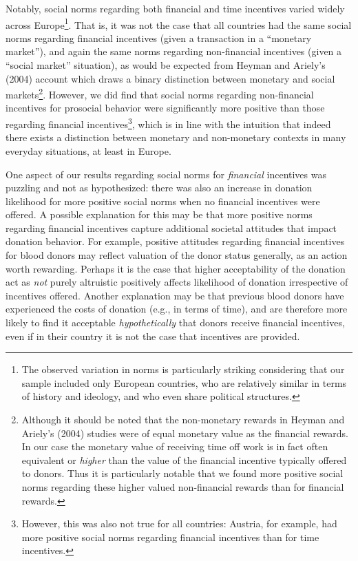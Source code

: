 \documentclass[AER]{AEA}
\begin{document}
Notably, social norms regarding both financial and time incentives varied widely across Europe\footnote{The observed variation in norms is particularly striking considering that our sample included only European countries, who are relatively similar in terms of history and ideology, and who even share political structures.}. That is, it was not the case that all countries had the same social norms regarding financial incentives (given a transaction in a “monetary market”), and again the same norms regarding non-financial incentives (given a “social market” situation), as would be expected from Heyman and Ariely’s (2004) account which draws a binary distinction between monetary and social markets\footnote{Although it should be noted that the non-monetary rewards in Heyman and Ariely’s (2004) studies were of equal monetary value as the financial rewards. In our case the monetary value of receiving time off work is in fact often equivalent or \textit{higher} than the value of the financial incentive typically offered to donors. Thus it is particularly notable that we found more positive social norms regarding these higher valued non-financial rewards than for financial rewards.}. However, we did find that social norms regarding non-financial incentives for prosocial behavior were significantly more positive than those regarding financial incentives\footnote{However, this was also not true for all countries: Austria, for example, had more positive social norms regarding financial incentives than for time incentives.}, which is in line with the intuition that indeed there exists a distinction between monetary and non-monetary contexts in many everyday situations, at least in Europe. 

One aspect of our results regarding social norms for \textit{financial} incentives was puzzling and not as hypothesized: there was also an increase in donation likelihood for more positive social norms when no financial incentives were offered. A possible explanation for this may be that more positive norms regarding financial incentives capture additional societal attitudes that impact donation behavior. For example, positive attitudes regarding financial incentives for blood donors may reflect valuation of the donor status generally, as an action worth rewarding. Perhaps it is the case that higher acceptability of the donation act as \textit{not} purely altruistic positively affects likelihood of donation irrespective of incentives offered. Another explanation may be that previous blood donors have experienced the costs of donation (e.g., in terms of time), and are therefore more likely to find it acceptable \textit{hypothetically} that donors receive financial incentives, even if in their country it is not the case that incentives are provided.
\end{document}
